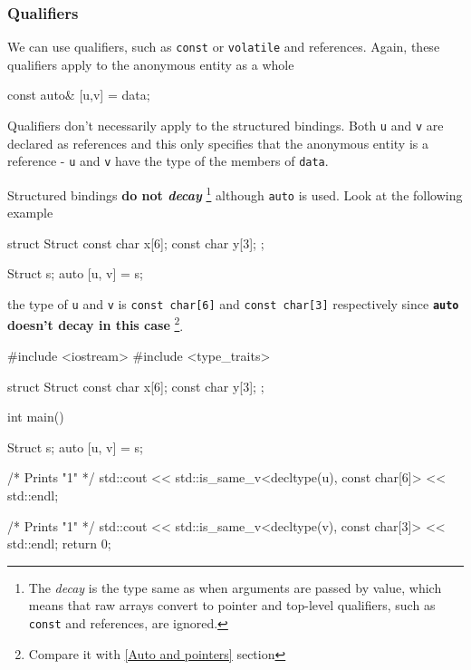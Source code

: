 \documentclass[../main]{subfiles}
\begin{document}
\subsubsection{Qualifiers}
    We can use qualifiers, such as \texttt{const} or \texttt{volatile} and references. Again, these qualifiers apply to the anonymous entity as a whole
\begin{Code}
    const auto& [u,v] = data;
\end{Code}
\noindent
Qualifiers don’t necessarily apply to the structured bindings. Both
\texttt{u} and \texttt{v} are declared as references and this only
specifies that the anonymous entity is a reference -
\texttt{u} and \texttt{v} have the type of the members of
\texttt{data}.\newline

    Structured bindings \textbf{do not \textit{decay}}
\footnote{The \textit{decay} is the type same as when arguments are 
passed by value, which means that raw arrays convert to pointer and
top-level qualifiers, such as \texttt{const} and references, are ignored.}
although \texttt{auto} is used. Look at the following example
\begin{Code}
    struct Struct
    {
        const char x[6];
        const char y[3];
    };
    
    Struct s{};
    auto [u, v] = s;
\end{Code}
the type of \texttt{u} and \texttt{v} is \texttt{const char[6]} and 
\texttt{const char[3]} respectively since
\textbf{\texttt{auto} doesn't decay in  this case}
\footnote{Compare it with \ref{Auto and pointers} section}.
\begin{Code}
    #include <iostream>
    #include <type_traits>
    
    struct Struct
    {
        const char x[6];
        const char y[3];
    };
    
    int main()
    {
        Struct s{};
        auto [u, v] = s;
        
        /* Prints "1" */
        std::cout << std::is_same_v<decltype(u), const char[6]> << std::endl;
        
        /* Prints "1" */
        std::cout << std::is_same_v<decltype(v), const char[3]> << std::endl;
        return 0;
    }    
\end{Code}
\end{document}
